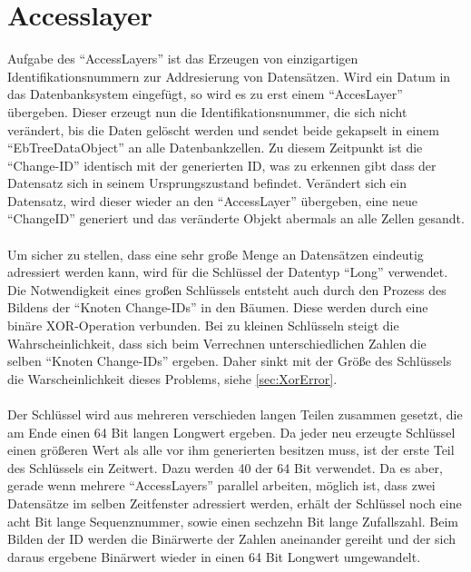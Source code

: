 \documentclass[a4paper,11pt,oneside,%
headsepline,												%
footsepline,												%
bibtotocnumbered									%
]{scrreprt}
\begin{document}
\section{Accesslayer}
Aufgabe des \enquote{AccessLayers} ist das Erzeugen von einzigartigen Identifikationsnummern zur Addresierung von Datensätzen. Wird ein Datum in das Datenbanksystem eingefügt, so wird es zu erst einem \enquote{AccesLayer} übergeben. Dieser erzeugt nun die Identifikationsnummer, die sich nicht verändert, bis die Daten gelöscht werden und sendet beide gekapselt in einem \enquote{EbTreeDataObject} an alle Datenbankzellen. Zu diesem Zeitpunkt ist die \enquote{Change-ID} identisch mit der generierten ID, was zu erkennen gibt dass der Datensatz sich in seinem Ursprungszustand befindet. Verändert sich ein Datensatz, wird dieser wieder an den \enquote{AccessLayer} übergeben, eine neue \enquote{ChangeID} generiert und das veränderte Objekt abermals an alle Zellen gesandt.\\\\
Um sicher zu stellen, dass eine sehr große Menge an Datensätzen eindeutig adressiert werden kann, wird für die Schlüssel der Datentyp \enquote{Long} verwendet. Die Notwendigkeit eines großen Schlüssels entsteht auch durch den Prozess des Bildens der \enquote{Knoten Change-IDs} in den Bäumen. Diese werden durch eine binäre XOR-Operation verbunden. Bei zu kleinen Schlüsseln steigt die Wahrscheinlichkeit, dass sich beim Verrechnen unterschiedlichen Zahlen die selben \enquote{Knoten Change-IDs} ergeben. Daher sinkt mit der Größe des Schlüssels die Warscheinlichkeit dieses Problems, siehe \autoref{sec:XorError}.\\\\
Der Schlüssel wird aus mehreren verschieden langen Teilen zusammen gesetzt, die am Ende einen 64 Bit langen Longwert ergeben. Da jeder neu erzeugte Schlüssel einen größeren Wert als alle vor ihm generierten besitzen muss, ist der erste Teil des Schlüssels ein Zeitwert. Dazu werden 40 der 64 Bit verwendet. Da es aber, gerade wenn mehrere \enquote{AccessLayers} parallel arbeiten, möglich ist, dass zwei Datensätze im selben Zeitfenster adressiert werden, erhält der Schlüssel noch eine acht Bit lange Sequenznummer, sowie einen sechzehn Bit lange Zufallszahl. Beim Bilden der ID werden die Binärwerte der Zahlen aneinander gereiht und der sich daraus ergebene Binärwert wieder in einen 64 Bit Longwert umgewandelt.
\end{document}
